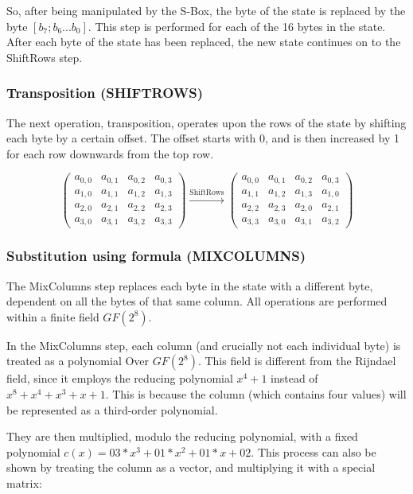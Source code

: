 \documentclass[12pt]{report}
\theoremstyle{definition}
\theoremstyle{remark}
\begin{document}
So, after being manipulated by the S-Box, the byte of the state is replaced by the byte $[b_7; b_6 ... b_0 ]$. This step is performed for each of the 16 bytes in the state. After each byte of the state has been replaced, the new state continues on to the ShiftRows step.

\subsubsection{Transposition (SHIFTROWS)}
The next operation, transposition, operates upon the rows of the state by shifting each byte by a certain offset. The offset starts with 0, and is then increased by 1 for each row downwards from the top row.

\[ \left( \begin{array}{cccc}
a_{0,0} & a_{0,1} & a_{0,2} & a_{0,3} \\
a_{1,0} & a_{1,1} & a_{1,2} & a_{1,3} \\
a_{2,0} & a_{2,1} & a_{2,2} & a_{2,3} \\
a_{3,0} & a_{3,1} & a_{3,2} & a_{3,3}\end{array} \right)
\xrightarrow{\text{ShiftRows}}
\left( \begin{array}{cccc}
a_{0,0} & a_{0,1} & a_{0,2} & a_{0,3} \\
a_{1,1} & a_{1,2} & a_{1,3} & a_{1,0} \\
a_{2,2} & a_{2,3} & a_{2,0} & a_{2,1} \\
a_{3,3} & a_{3,0} & a_{3,1} & a_{3,2}\end{array} \right)
\]

\subsubsection{Substitution using formula (MIXCOLUMNS)}
The MixColumns step replaces each byte in the state with a different byte, dependent on all the bytes of that same column. All operations are performed within a finite field $GF(2^8)$.

In the MixColumns step, each column (and crucially not each individual byte) is treated as a polynomial Over $GF(2^8)$. This field is different from the Rijndael field, since it employs the reducing polynomial $x^4+1$ instead of $x^8+x^4+x^3+x+1$. This is because the column (which contains four values) will be represented as a third-order polynomial\cite{Rijndael}.

They are then multiplied, modulo the reducing polynomial, with a fixed polynomial $c(x)=03*x^3+01*x^2+01*x+02$. This process can also be shown by treating the column as a vector, and multiplying it with a special matrix:
\end{document}

